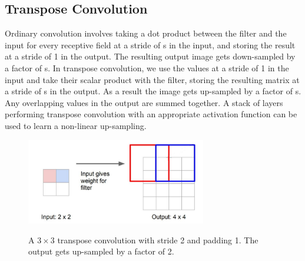 \documentclass[12pt, a4paper]{report}
\begin{document}
\subsection{Transpose Convolution}
Ordinary convolution involves taking a dot product between the filter and the input for every receptive field at a stride of s in the input, and storing the result at a stride of 1 in the output. The resulting output image gets down-sampled by a factor of s. In transpose convolution, we use the values at a stride of 1 in the input and take their scalar product with the filter, storing the resulting matrix at a stride of s in the output. As a result the image gets up-sampled by a factor of s. Any overlapping values in the output are summed together.\cite{long2015fully, cs231n}
A stack of layers performing transpose convolution with an appropriate activation function can be used to learn a non-linear up-sampling.\cite{long2015fully}\begin{figure}[h]
\centering
\includegraphics[width=0.7\textwidth]{fcn.jpg}
\caption{A $3 \times 3$ transpose convolution with stride 2 and padding 1. The output gets up-sampled by a factor of 2.}
\cite{cs231n}
\end{figure}
\end{document}
